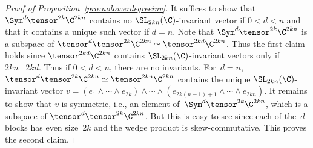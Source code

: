 \begin{proof}[Proof of Proposition~\ref{pro:nolowerdegreeinv}]
It suffices to show that $\Sym^d \tensor^{2k} \C^{2kn}$ contains no $\SL_{2kn}(\C)$-invariant vector if $0<d<n$ and that it contains a unique such vector if $d=n$.
Note that $\Sym^d \tensor^{2k} \C^{2kn}$ is a subspace of $\tensor^d \tensor^{2k} \C^{2kn} \simeq \tensor^{2kd} \C^{2kn}$.
Thus the first claim holds since $\tensor^{2kd} \C^{2kn}$ contains $\SL_{2kn}(\C)$-invariant vectors only if $2kn \mid 2kd$. Thus if $0 < d < n$, there are no invariants.
For~$d=n$, $\tensor^d \tensor^{2k} \C^{2kn} \simeq \tensor^{2kn} \C^{2kn}$ contains the unique $\SL_{2kn}(\C)$-invariant vector $v = (e_1 \wedge \cdots \wedge e_{2k}) \wedge \cdots \wedge (e_{2k(n-1)+1} \wedge \cdots \wedge e_{2kn})$.
It remains to show that $v$ is symmetric, i.e., an element of~$\Sym^d \tensor^{2k} \C^{2kn}$, which is a subspace of $\tensor^d \tensor^{2k} \C^{2kn}$.
But this is easy to see since each of the~$d$ blocks has even size~$2k$ and the wedge product is skew-commutative.
This proves the second claim.
\end{proof}

%
%

%
%

%
%

%
%
%
%
%
%
%
%
%
%
%
%
%

%
%
%
%
%
%

